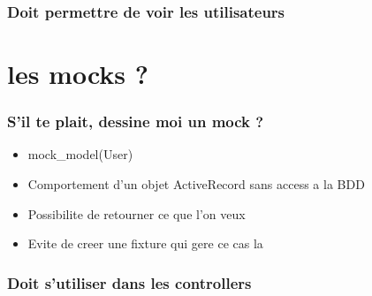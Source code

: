 \documentclass{beamer}
\begin{document}
\begin{frame}
    \frametitle{Doit permettre de voir les utilisateurs}
    \begin{center}
        
    \end{center}
\end{frame}

\section{les mocks ?}

\begin{frame}
  \frametitle{S'il te plait, dessine moi un mock ?}
  \begin{itemize}
    \item mock\_model(User)
    \item Comportement d'un objet ActiveRecord sans access a la BDD
    \item Possibilite de retourner ce que l'on veux
    \item Evite de creer une fixture qui gere ce cas la
  \end{itemize}
\end{frame}

\begin{frame}
  \frametitle{Doit s'utiliser dans les controllers}
  \begin{center}
    
  \end{center}
\end{frame}
\end{document}
